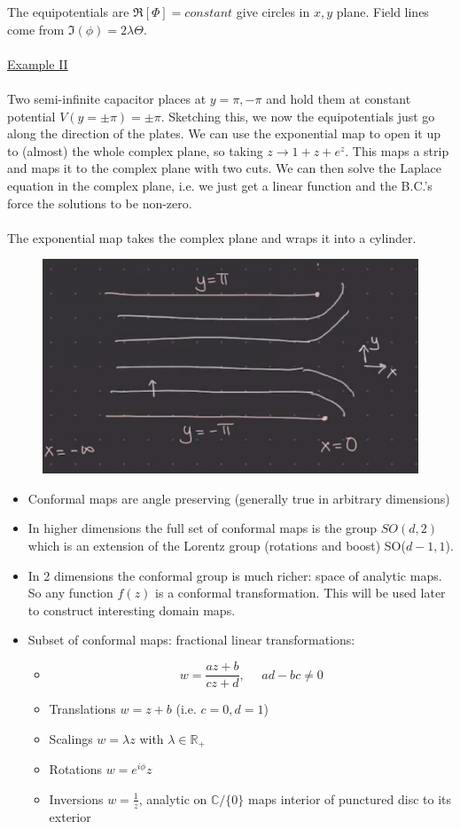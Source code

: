 \documentclass[a4paper,12pt]{article}
\begin{document}
The equipotentials are $\Re[\Phi]=constant$ give circles in $x,y$ plane. Field lines come from $\Im(\phi)=2\lambda \Theta$.
\\\\
\underline{Example II}
\\\\
Two semi-infinite capacitor places at $y={\pi,-\pi}$ and hold them at constant potential $V(y=\pm \pi)=\pm \pi$. Sketching this, we now the equipotentials just go along the direction of the plates. We can use the exponential map to open it up to (almost) the whole complex plane, so taking $z\to1+z+e^z$. This maps a strip and maps it to the complex plane with two cuts. We can then solve the Laplace equation in the complex plane, i.e. we just get a linear function and the B.C.'s force the solutions to be non-zero.\\\\
The exponential map takes the complex plane and wraps it into a cylinder.
\begin{figure}[H]
	\centering
	\includegraphics[width=0.7\linewidth]{5}
	\caption{}
	\label{fig:4}
\end{figure}
\begin{itemize}
\item Conformal maps are angle preserving (generally true in arbitrary dimensions)
\item In higher dimensions the full set of conformal maps is the group $SO(d,2)$ which is an extension of the Lorentz group (rotations and boost) SO($d-1,1$).
\item In 2 dimensions the conformal group is much richer: space of analytic maps. So any function $f(z)$ is a conformal transformation. This will be used later to construct interesting domain maps.
\item Subset of conformal maps: fractional linear transformations:
\begin{itemize}
	\item \begin{equation}
		w=\frac{az+b}{cz+d},~~~~~~ad-bc\neq0
	\end{equation}
	\item Translations $w=z+b$ (i.e. $c=0,d=1$)
	\item Scalings $w=\lambda z$ with $\lambda\in \mathds{R}_+$
	\item Rotations $w=e^{i\phi}z$
	\item Inversions $w=\frac{1}{z}$, analytic on $\mathds{C}/\{0\}$ maps interior of punctured disc to its exterior
 \end{itemize}
\end{itemize}
\end{document}
